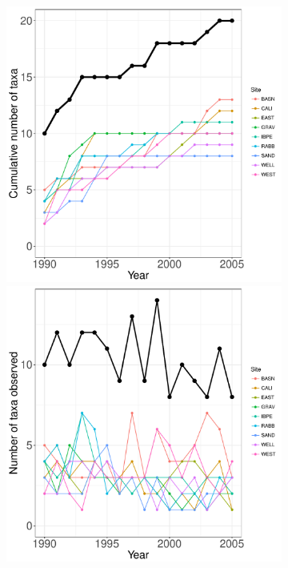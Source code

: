\documentclass[11pt, oneside]{article}
\begin{document}
\begin{figure}[h!]
\begin{figure}[h!]
\centering
\includegraphics[scale = 0.4]{jrn-lizards-hope_species_accumulation_curve.pdf}
\includegraphics[scale = 0.4]{jrn-lizards-hope_num_taxa_over_time.pdf}

\end{figure}
\end{figure}
\end{document}
